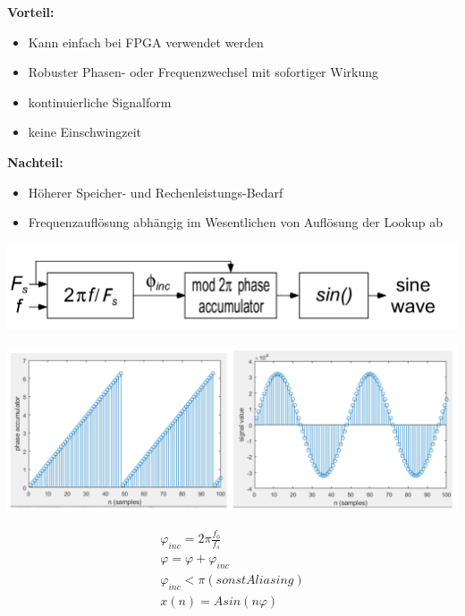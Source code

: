 \documentclass[10pt,a4paper]{article}
\begin{document}
\textbf{Vorteil:}
\begin{itemize}
  \item Kann einfach bei FPGA verwendet werden
  \item Robuster Phasen- oder Frequenzwechsel mit sofortiger Wirkung
  \item kontinuierliche Signalform
  \item keine Einschwingzeit
\end{itemize}  

\textbf{Nachteil:}
\begin{itemize}
  \item Höherer Speicher- und Rechenleistungs-Bedarf
  \item Frequenzauflösung abhängig im Wesentlichen von Auflösung der Lookup ab
\end{itemize}  

\begin{center}
  \includegraphics[width=.5\textwidth]{./img/DDS_sin().png}
\end{center} 

\begin{center}
  \includegraphics[width=.5\textwidth]{./img/sin_phaseincrement.png}
\end{center} 

  \begin{mdframed}[style=exercise]
    \begin{align}
        \varphi_{inc} = 2\pi\frac{f_0}{f_s}\\
        \varphi = \varphi + \varphi_{inc}\\
        \varphi_{inc} < \pi (sonst Aliasing)\\
        x(n)= Asin(n\varphi)
    \end{align}
  \end{mdframed}
\end{document}
